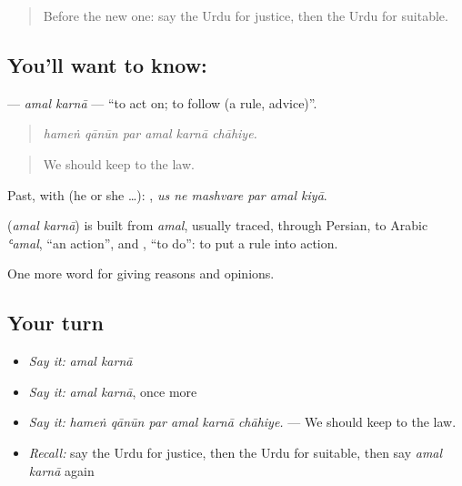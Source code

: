 \label{lesson:UR-C339-amal-karna}



\begin{quote}
Before the new one: say the Urdu for justice, then the Urdu for suitable.
\end{quote}

\subsection*{You'll want to know:  }
\textbf{ } — \emph{amal karnā} — \textquotedblleft{}to act on; to follow (a rule, advice)\textquotedblright{}.

\begin{quote}
     
\end{quote}

\begin{quote}
\emph{hameṅ qānūn par amal karnā chāhiye.}
\end{quote}

\begin{quote}
We should keep to the law.
\end{quote}

Past, with  (he or she …):      , \emph{us ne mashvare par amal kiyā}.

\begin{cousinweb}
\textbf{ } (\emph{amal karnā}) is built from \emph{amal}, usually traced, through Persian, to Arabic \emph{ʿamal}, \textquotedblleft{}an action\textquotedblright{}, and \textbf{}, \textquotedblleft{}to do\textquotedblright{}: to put a rule into action.
\end{cousinweb}

\begin{grammarlens}[title={What you've built}]
One more word for giving reasons and opinions.
\end{grammarlens}

\subsection*{Your turn}
\begin{itemize}
\raggedright
  \item \emph{Say it:} \emph{amal karnā}
  \item \emph{Say it:} \emph{amal karnā}, once more
  \item \emph{Say it:} \emph{hameṅ qānūn par amal karnā chāhiye.} — We should keep to the law.
  \item \emph{Recall:} say the Urdu for justice, then the Urdu for suitable, then say \emph{amal karnā} again
\end{itemize}

